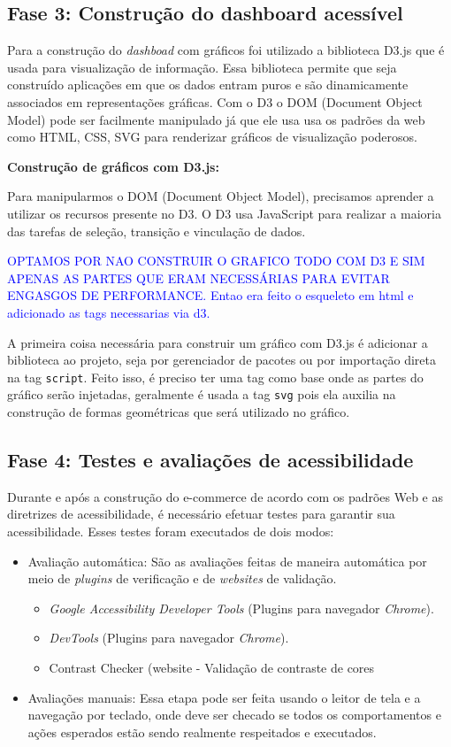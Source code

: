 \subsection{Fase 3: Construção do dashboard acessível}
{Para a construção do \textit{dashboad} com gráficos foi utilizado a biblioteca D3.js que é usada para visualização de informação. Essa biblioteca permite que seja construído aplicações em que os dados entram puros e são dinamicamente associados em representações gráficas. Com o D3 o DOM (Document Object Model) pode ser facilmente manipulado já que ele usa usa os padrões da web como HTML, CSS, SVG para renderizar gráficos de visualização poderosos.}

{\textbf{Construção de gráficos com D3.js:}

Para manipularmos o DOM (Document Object Model), precisamos aprender a utilizar os recursos presente no D3. O D3 usa JavaScript para realizar a maioria das tarefas de seleção, transição e vinculação de dados.

{\textcolor{blue}{OPTAMOS POR NAO CONSTRUIR O GRAFICO TODO COM D3 E SIM APENAS AS PARTES QUE ERAM NECESSÁRIAS PARA EVITAR ENGASGOS DE PERFORMANCE. Entao era feito o esqueleto em html e adicionado as tags necessarias via d3.}}

A primeira coisa necessária para construir um gráfico com D3.js é adicionar a biblioteca ao projeto, seja por gerenciador de pacotes ou por importação direta na tag \lstinline{script}. Feito isso, é preciso ter uma tag como base onde as partes do gráfico serão injetadas, geralmente é usada a tag \lstinline{svg} pois ela auxilia na construção de formas geométricas que será utilizado no gráfico.

}
\subsection{Fase 4: Testes e avaliações de acessibilidade}
{Durante e após a construção do e-commerce de acordo com os
padrões Web e as diretrizes de acessibilidade, é necessário efetuar testes para garantir sua acessibilidade. Esses testes foram executados de dois modos: 
\begin{itemize}
\item Avaliação automática: São as avaliações feitas de maneira automática por meio de \textit{plugins} de verificação e de \textit{websites} de validação.
\begin{itemize}
\item \textit{Google Accessibility Developer Tools} ({Plugins} para navegador \textit{Chrome}).
\item \textit{DevTools }({Plugins} para navegador \textit{Chrome}).
\item Contrast Checker (website - Validação de contraste de cores
\end{itemize}
\item Avaliações manuais: Essa etapa pode ser feita usando o leitor de tela e a navegação por teclado, onde deve ser checado se todos os comportamentos e ações esperados estão sendo realmente respeitados e executados. 
\end{itemize}
}

